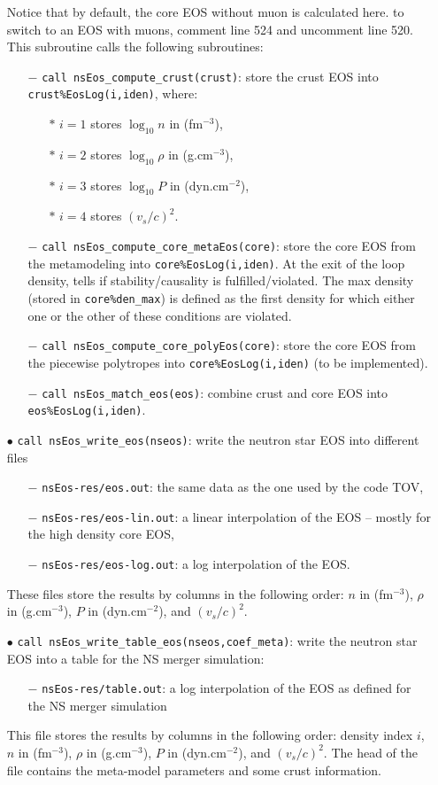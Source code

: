 \documentclass[11pt]{article}
\newcommand{\code}[1]{\colorbox{light-gray}{\mbox{\texttt{#1}}}}
\begin{document}
\begin{enumerate}
Notice that by default, the core EOS without muon is calculated here. to switch to an EOS with muons, comment line 524 and uncomment line 520.
This subroutine calls the following subroutines:
\begin{enumerate}
\item[$-$] \code{call nsEos\_compute\_crust(crust)}: store the crust EOS into \code{crust\%EosLog(i,iden)}, where: 
\begin{enumerate}
\item[$*$] $i=1$ stores $\log_{10} n$ in (fm$^{-3}$), 
\item[$*$] $i=2$ stores $\log_{10} \rho$ in (g.cm$^{-3}$), 
\item[$*$] $i=3$ stores $\log_{10} P$ in (dyn.cm$^{-2}$), 
\item[$*$] $i=4$ stores $(v_s/c)^2$.
\end{enumerate}
\item[$-$] \code{call nsEos\_compute\_core\_metaEos(core)}: store the core EOS from the metamodeling into \code{core\%EosLog(i,iden)}. At the exit of the loop density, tells if stability/causality is fulfilled/violated. The max density (stored in \code{core\%den\_max}) is defined as the first density for which either one or the other of these conditions are violated.
\item[$-$] \code{call nsEos\_compute\_core\_polyEos(core)}: store the core EOS from the piecewise polytropes into \code{core\%EosLog(i,iden)} (to be implemented).
\item[$-$] \code{call nsEos\_match\_eos(eos)}: combine crust and core EOS into \code{eos\%EosLog(i,iden)}.
\end{enumerate}
\item[$\bullet$] \code{call nsEos\_write\_eos(nseos)}: write the neutron star EOS into different files 
\begin{enumerate}
\item[$-$] \code{nsEos-res/eos.out}: the same data as the one used by the code TOV, 
\item[$-$] \code{nsEos-res/eos-lin.out}: a linear interpolation of the EOS -- mostly for the high density core EOS, 
\item[$-$] \code{nsEos-res/eos-log.out}: a log interpolation of the EOS.
\end{enumerate}
These files store the results by columns in the following order: $n$ in (fm$^{-3}$), $\rho$ in (g.cm$^{-3}$), $P$ in (dyn.cm$^{-2}$), and $(v_s/c)^2$.
\item[$\bullet$] \code{call nsEos\_write\_table\_eos(nseos,coef\_meta)}: write the neutron star EOS into a table for the NS merger simulation:
\begin{enumerate}
\item[$-$] \code{nsEos-res/table.out}: a log interpolation of the EOS as defined for the NS merger simulation
\end{enumerate}
This file stores the results by columns in the following order: density index $i$, $n$ in (fm$^{-3}$), $\rho$ in (g.cm$^{-3}$), $P$ in (dyn.cm$^{-2}$), and $(v_s/c)^2$.
The head of the file contains the meta-model parameters and some crust information.
\end{enumerate}
\end{document}
